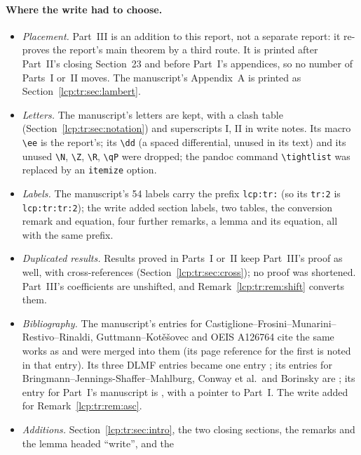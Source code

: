 \documentclass[11pt]{article}
\numberwithin{equation}{section}
\theoremstyle{definition}\newtheorem{definition}[theorem]{Definition}
\theoremstyle{remark}\newtheorem{remark}[theorem]{Remark}
\newcommand{\ee}{\mathrm e}
\newcommand{\dd}{\mathrm d}%
\begin{document}
\paragraph{Where the write had to choose.}
\begin{itemize}[leftmargin=*,itemsep=0.15em]
\item \emph{Placement.} Part~III is an addition to this report, not a
 separate report: it re-proves the report's main theorem by a third route.
 It is printed after Part~II's closing Section~23 and before Part~I's
 appendices, so no number of Parts~I or~II moves. The manuscript's
 Appendix~A is printed as Section~\ref{lcp:tr:sec:lambert}.
\item \emph{Letters.} The manuscript's letters are kept, with a clash table
 (Section~\ref{lcp:tr:sec:notation}) and superscripts $\mathrm I$,
 $\mathrm{II}$ in write notes. Its macro \verb|\ee| is the report's; its
 \verb|\dd| (a spaced differential, unused in its text) and its unused
 \verb|\N|, \verb|\Z|, \verb|\R|, \verb|\qP| were dropped; the pandoc
 command \verb|\tightlist| was replaced by an \verb|itemize| option.
\item \emph{Labels.} The manuscript's 54 labels carry the prefix
 \texttt{lcp:tr:} (so its \texttt{tr:2} is \texttt{lcp:tr:tr:2}); the write
 added section labels, two tables, the conversion remark and equation,
 four further remarks, a lemma and its equation, all with the same prefix.
\item \emph{Duplicated results.} Results proved in Parts~I or~II keep
 Part~III's proof as well, with cross-references
 (Section~\ref{lcp:tr:sec:cross}); no proof was shortened. Part~III's
 coefficients are unshifted, and Remark~\ref{lcp:tr:rem:shift} converts them.
\item \emph{Bibliography.} The manuscript's entries for
 Castiglione--Frosini--Munarini--Restivo--Rinaldi, Guttmann--Kot\v e\v sovec
 and OEIS A126764 cite the same works as \cite{castiglione,gk,oeis,bfile}
 and were merged into them (its page reference for the first is noted in
 that entry). Its three DLMF entries became one entry \cite{lcp-tr-dlmf};
 its entries for Bringmann--Jennings-Shaffer--Mahlburg, Conway et al.\ and
 Borinsky are \cite{lcp-tr-bjm,lcp-tr-conway,lcp-tr-borinsky}; its entry for
 Part~I's manuscript is \cite{lcp-tr-earlier}, with a pointer to Part~I. The
 write added \cite{lcp-tr-kls} for Remark~\ref{lcp:tr:rem:asc}.
\item \emph{Additions.} Section~\ref{lcp:tr:sec:intro}, the two closing
 sections, the remarks and the lemma headed ``write'', and the

\end{itemize}
\end{document}
